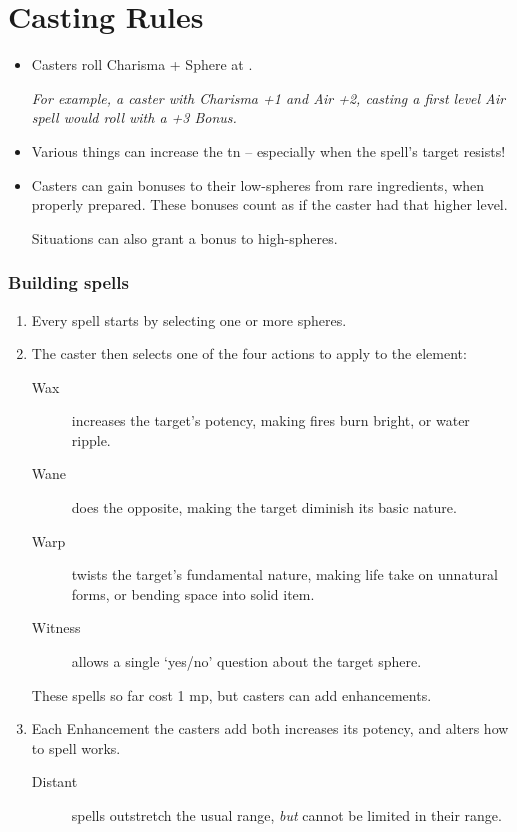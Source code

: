 
\chapter{Casting Rules}

\begin{multicols}{2}

\begin{itemize}
  \item
  Casters roll Charisma + Sphere at \tn[7].

  \textit{For example, a caster with Charisma +1 and Air +2, casting a first level Air spell would roll with a +3 Bonus.}
  \item
  Various things can increase the \gls{tn} -- especially when the spell's target resists!
  \item
  Casters can gain bonuses to their low-spheres from rare ingredients, when properly prepared.
  These bonuses count as if the caster had that higher level.

  Situations can also grant a bonus to high-spheres.
\end{itemize}

\subsection{Building spells}

\begin{enumerate}
  \item
  Every spell starts by selecting one or more spheres.
  \item
  The caster then selects one of the four actions to apply to the element:
  \begin{description}
    \item[Wax]
    increases the target's potency, making fires burn bright, or water ripple.
    \item[Wane]
    does the opposite, making the target diminish its basic nature.
    \item[Warp]
    twists the target's fundamental nature, making life take on unnatural forms, or bending space into solid item.
    \item[Witness]
    allows a single `yes/no' question about the target sphere.
  \end{description}
  These spells so far cost 1 \gls{mp}, but casters can add enhancements.
  \item
  Each Enhancement the casters add both increases its potency, and alters how to spell works.
  \begin{description}
    \item[Distant]
    spells outstretch the usual range, \emph{but} cannot be limited in their range.
  \end{description}
\end{enumerate}

\end{multicols}
